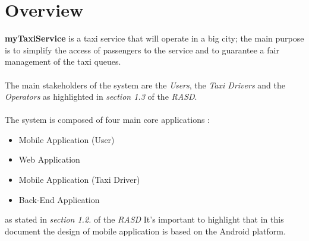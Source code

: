 \section{Overview} %
\label{sec:overview}
\textbf{myTaxiService} is a taxi service that will operate in a big city; the main purpose is to simplify the access of passengers to the service and to guarantee a fair management of the taxi queues.\\\\
The main stakeholders of the system are the \emph{Users}, the \emph{Taxi Drivers} and the \emph{Operators} as highlighted in \emph{section 1.3} of the \emph{RASD}.\\\\
The system is composed of four main core applications :
\begin{itemize}
	\item Mobile Application (User)
	\item Web Application
	\item Mobile Application (Taxi Driver)
	\item Back-End Application
\end{itemize}
 as stated in \emph{section 1.2.} of the \emph{RASD}
 It's important to highlight that in this document the design of mobile application is based on the Android platform.


